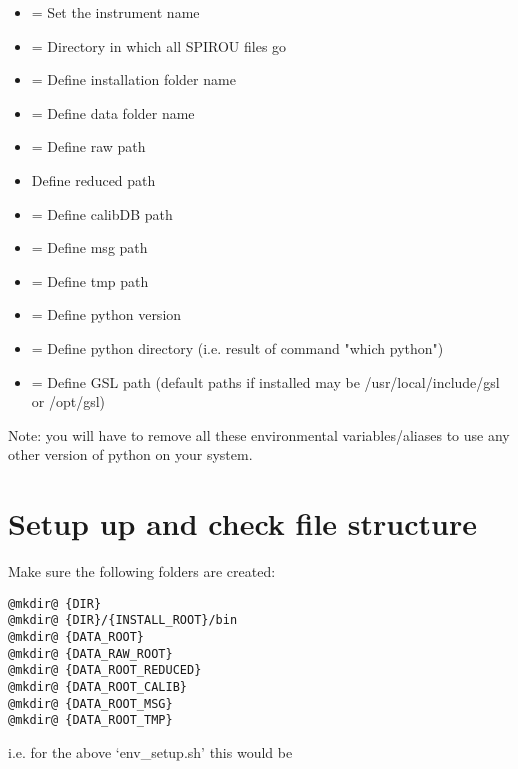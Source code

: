 \begin{itemize}
\item {} = Set the instrument name
\item {}= Directory in which all SPIROU files go
\item {} = Define installation folder name
\item {} = Define data folder name
\item {} = Define raw path
\item {} Define reduced path
\item {} = Define calibDB path
\item {} = Define msg path
\item {} = Define tmp path
\item {} = Define python version
\item {} = Define python directory (i.e. result of command "which python")
\item {} = Define GSL path (default paths if installed may be /usr/local/include/gsl or /opt/gsl)
\end{itemize}

\noindent Note: you will have to remove all these environmental variables/aliases to use any other version of python on your system.

\section{Setup up and check file structure}
\label{section:folder_setup}

Make sure the following folders are created:

\begin{lstlisting}[style=bashstyle]
@mkdir@ {DIR}
@mkdir@ {DIR}/{INSTALL_ROOT}/bin
@mkdir@ {DATA_ROOT}
@mkdir@ {DATA_RAW_ROOT}
@mkdir@ {DATA_ROOT_REDUCED}
@mkdir@ {DATA_ROOT_CALIB}
@mkdir@ {DATA_ROOT_MSG}
@mkdir@ {DATA_ROOT_TMP}
\end{lstlisting}

\noindent i.e. for the above `env\_setup.sh' this would be

